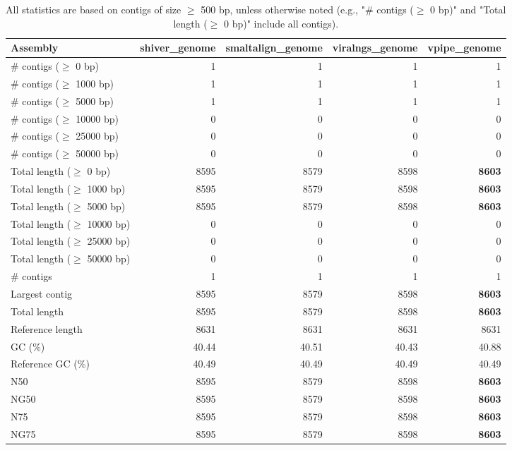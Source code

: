 \documentclass[12pt,a4paper]{article}
\begin{document}
\begin{table}[ht]
\begin{center}
\caption{All statistics are based on contigs of size $\geq$ 500 bp, unless otherwise noted (e.g., "\# contigs ($\geq$ 0 bp)" and "Total length ($\geq$ 0 bp)" include all contigs).}
\begin{tabular}{|l*{4}{|r}|}
\hline
Assembly & shiver\_genome & smaltalign\_genome & viralngs\_genome & vpipe\_genome \\ \hline
\# contigs ($\geq$ 0 bp) & 1 & 1 & 1 & 1 \\ \hline
\# contigs ($\geq$ 1000 bp) & 1 & 1 & 1 & 1 \\ \hline
\# contigs ($\geq$ 5000 bp) & 1 & 1 & 1 & 1 \\ \hline
\# contigs ($\geq$ 10000 bp) & 0 & 0 & 0 & 0 \\ \hline
\# contigs ($\geq$ 25000 bp) & 0 & 0 & 0 & 0 \\ \hline
\# contigs ($\geq$ 50000 bp) & 0 & 0 & 0 & 0 \\ \hline
Total length ($\geq$ 0 bp) & 8595 & 8579 & 8598 & {\bf 8603} \\ \hline
Total length ($\geq$ 1000 bp) & 8595 & 8579 & 8598 & {\bf 8603} \\ \hline
Total length ($\geq$ 5000 bp) & 8595 & 8579 & 8598 & {\bf 8603} \\ \hline
Total length ($\geq$ 10000 bp) & 0 & 0 & 0 & 0 \\ \hline
Total length ($\geq$ 25000 bp) & 0 & 0 & 0 & 0 \\ \hline
Total length ($\geq$ 50000 bp) & 0 & 0 & 0 & 0 \\ \hline
\# contigs & 1 & 1 & 1 & 1 \\ \hline
Largest contig & 8595 & 8579 & 8598 & {\bf 8603} \\ \hline
Total length & 8595 & 8579 & 8598 & {\bf 8603} \\ \hline
Reference length & 8631 & 8631 & 8631 & 8631 \\ \hline
GC (\%) & 40.44 & 40.51 & 40.43 & 40.88 \\ \hline
Reference GC (\%) & 40.49 & 40.49 & 40.49 & 40.49 \\ \hline
N50 & 8595 & 8579 & 8598 & {\bf 8603} \\ \hline
NG50 & 8595 & 8579 & 8598 & {\bf 8603} \\ \hline
N75 & 8595 & 8579 & 8598 & {\bf 8603} \\ \hline
NG75 & 8595 & 8579 & 8598 & {\bf 8603} \\ \hline

\end{tabular}
\end{center}
\end{table}
\end{document}
